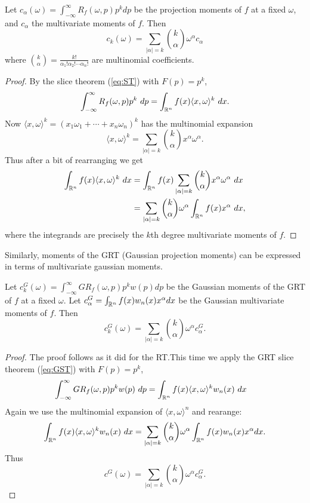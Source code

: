\begin{proposition}
  Let $c_\alpha (\omega) = \int_{-\infty}^\infty R_f(\omega, p) p^k dp$ be the projection moments of $f$ at a fixed $\omega$, and $c_\alpha$ the multivariate moments of $f$. Then
  \[
      c_k(\omega) = \sum_{|\alpha| = k}\binom{k}{\alpha} \omega^\alpha c_\alpha
  \]
  where $\binom{k}{\alpha} = \frac{k!}{\alpha_1! \alpha_2! \cdots \alpha_n!}$ are multinomial coefficients.
\end{proposition}

\begin{proof}
  By the slice theorem (\ref{eq:ST}) with $F(p) = p^k$,
  \[
    \int_{-\infty}^\infty R_f(\omega, p) p^k ~dp 
    = \int_{\mathbb{R}^n} f(x) \langle x, \omega \rangle^k ~dx.
  \]
  Now $\langle x, \omega \rangle^k = {(x_1 \omega_1 + \cdots + x_n \omega_n)}^k$ has the multinomial expansion
  \[
    \langle x, \omega \rangle^k = \sum_{|\alpha| = k}\binom{k}{\alpha} x^\alpha\omega^\alpha.
  \]
  Thus after a bit of rearranging we get
  \begin{align*}
    \int_{\mathbb{R}^n} f(x) \langle x, \omega \rangle^k ~dx
    &= \int_{\mathbb{R}^n} f(x) \sum_{|\alpha| = k}\binom{k}{\alpha} x^\alpha \omega^\alpha ~dx \\
    &= \sum_{|\alpha| = k}\binom{k}{\alpha} \omega^\alpha \int_{\mathbb{R}^n} f(x) x^\alpha ~dx,
  \end{align*}
  where the integrands are precisely the $k$th degree multivariate moments of $f$.
\end{proof}

Similarly, moments of the GRT (Gaussian projection moments) can be expressed in terms of multivariate gaussian moments.

\begin{proposition}
  Let $c_k^G(\omega) = \int_{-\infty}^\infty GR_f(\omega, p) p^k w(p) dp$ be the Gaussian moments of the GRT of $f$ at a fixed $\omega$. Let $c^G_\alpha = \int_{\mathbb{R}^n} f(x) w_n(x) x^\alpha dx$ be the Gaussian multivariate moments of $f$. Then
  \[
    c^G_k(\omega) = \sum_{|\alpha| = k}\binom{k}{\alpha} \omega^\alpha c^G_\alpha.
  \]
\end{proposition}


\begin{proof}
  The proof follows as it did for the RT.\@ This time we apply the GRT slice theorem (\ref{eq:GST}) with $F(p) = p^k$, 
  \begin{align*}
    \int_{-\infty}^\infty GR_f(\omega, p) p^k w(p) ~dp
    &= \int_{\mathbb{R}^n} f(x) \langle x, \omega \rangle^k w_n(x) ~dx
  \end{align*}
  Again we use the multinomial expansion of $\langle x, \omega\rangle^n$ and rearange:
  \[
    \int_{\mathbb{R}^n} f(x) \langle x, \omega \rangle^k w_n(x) ~dx
    = \sum_{|\alpha| = k} \binom{k}{\alpha} \omega^\alpha \int_{\mathbb{R}^n} f(x) w_n(x)x^\alpha dx. 
  \]
  Thus
  \[
    c^G(\omega) = \sum_{|\alpha| = k} \binom{k}{\alpha} \omega^\alpha c^G_\alpha.
  \]
\end{proof}

